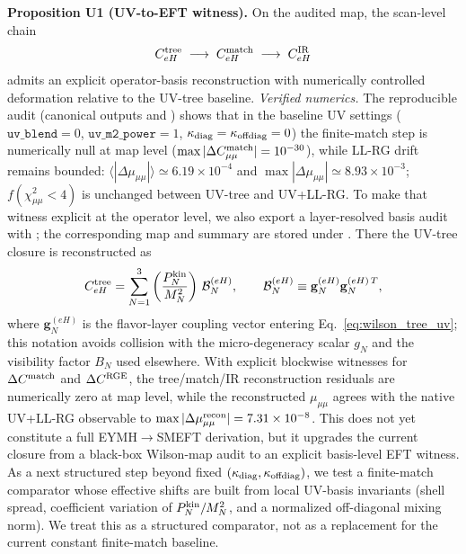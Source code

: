 \documentclass[aps,prd,onecolumn,notitlepage,nofootinbib,superscriptaddress,11pt,floatfix]{revtex4-2}
\begin{document}
\medskip\noindent\textbf{Proposition U1 (UV-to-EFT witness).}
On the audited map, the scan-level chain
\[
C_{eH}^{\rm tree}\;\longrightarrow\; C_{eH}^{\rm match}\;\longrightarrow\; C_{eH}^{\rm IR}
\]
admits an explicit operator-basis reconstruction with numerically controlled deformation relative to the UV-tree baseline.
\emph{Verified numerics.} The reproducible audit  (canonical outputs  and ) shows that in the baseline UV settings ($\texttt{uv\_blend}=0$, $\texttt{uv\_m2\_power}=1$, $\kappa_{\rm diag}=\kappa_{\rm offdiag}=0$) the finite-match step is numerically null at map level ($\max |\Delta C_{\mu\mu}^{\rm match}|=10^{-30}$), while LL-RG drift remains bounded: $\langle |\Delta \mu_{\mu\mu}|\rangle \simeq 6.19\times10^{-4}$ and $\max |\Delta \mu_{\mu\mu}|\simeq 8.93\times10^{-3}$; $f(\chi^2_{\mu\mu}<4)$ is unchanged between UV-tree and UV+LL-RG.
To make that witness explicit at the operator level, we also export a layer-resolved basis audit with ; the corresponding map and summary are stored under . There the UV-tree closure is reconstructed as
\begin{equation}
C_{eH}^{\rm tree}=\sum_{N=1}^{3}\left(\frac{P_N^{\rm kin}}{M_N^2}\right)\,\mathcal B_N^{(eH)},
\qquad
\mathcal B_N^{(eH)}\equiv \mathbf g_N^{(eH)}\mathbf g_N^{(eH)\,T},
\label{eq:ceh_operator_basis}
\end{equation}
where $\mathbf g_N^{(eH)}$ is the flavor-layer coupling vector entering Eq.~\eqref{eq:wilson_tree_uv}; this notation avoids collision with the micro-degeneracy scalar $g_N$ and the visibility factor $B_N$ used elsewhere. With explicit blockwise witnesses for $\Delta C^{\rm match}$ and $\Delta C^{\rm RGE}$, the tree/match/IR reconstruction residuals are numerically zero at map level, while the reconstructed $\mu_{\mu\mu}$ agrees with the native UV+LL-RG observable to $\max |\Delta \mu_{\mu\mu}^{\rm recon}|=7.31\times 10^{-8}$. This does not yet constitute a full EYMH$\rightarrow$SMEFT derivation, but it upgrades the current closure from a black-box Wilson-map audit to an explicit basis-level EFT witness.
As a next structured step beyond fixed $(\kappa_{\rm diag},\kappa_{\rm offdiag})$, we test a finite-match comparator whose effective shifts are built from local UV-basis invariants (shell spread, coefficient variation of $P_N^{\rm kin}/M_N^2$, and a normalized off-diagonal mixing norm). We treat this as a structured comparator, not as a replacement for the current constant finite-match baseline.
\end{document}
